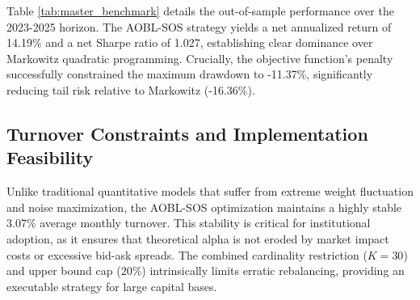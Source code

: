 \documentclass[11pt,a4paper]{article}
\begin{document}
\begin{table}[htbp]
\centering
\caption{Net-of-Cost Benchmark Analysis ($K=30$ Cardinality, 10 bps Transaction Cost, Monthly Rebalancing, 2023-2025)}
\label{tab:master_benchmark}
\end{table}

Table \ref{tab:master_benchmark} details the out-of-sample performance over the 2023-2025 horizon. The AOBL-SOS strategy yields a net annualized return of 14.19\% and a net Sharpe ratio of 1.027, establishing clear dominance over Markowitz quadratic programming. Crucially, the objective function's penalty successfully constrained the maximum drawdown to -11.37\%, significantly reducing tail risk relative to Markowitz (-16.36\%).

\subsection{Turnover Constraints and Implementation Feasibility}
Unlike traditional quantitative models that suffer from extreme weight fluctuation and noise maximization, the AOBL-SOS optimization maintains a highly stable 3.07\% average monthly turnover. This stability is critical for institutional adoption, as it ensures that theoretical alpha is not eroded by market impact costs or excessive bid-ask spreads. The combined cardinality restriction ($K=30$) and upper bound cap ($20\%$) intrinsically limits erratic rebalancing, providing an executable strategy for large capital bases.
\end{document}
